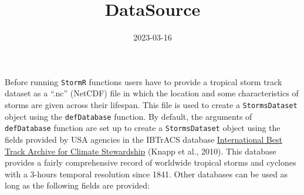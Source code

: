 \documentclass[
]{article}
\title{DataSource}
\author{}
\date{\vspace{-2.5em}2023-03-16}
\begin{document}
\maketitle

Before running \texttt{StormR} functions users have to provide a
tropical storm track dataset as a ``.nc'' (NetCDF) file in which the
location and some characteristics of storms are given across their
lifespan. This file is used to create a \texttt{StormsDataset} object
using the \texttt{defDatabase} function. By default, the arguments of
\texttt{defDatabase} function are set up to create a
\texttt{StormsDataset} object using the fields provided by USA agencies
in the IBTrACS database
\href{https://www.ncei.noaa.gov/products/international-best-track-archive}{International
Best Track Archive for Climate Stewardship} (Knapp et al., 2010). This
database provides a fairly comprehensive record of worldwide tropical
storms and cyclones with a 3-hours temporal resolution since 1841. Other
databases can be used as long as the following fields are provided:
\end{document}
